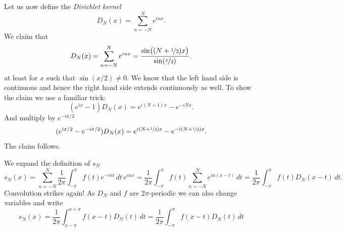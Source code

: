 \documentclass[12pt]{book}
\newcommand{\abs}[1]{\left\lvert {#1} \right\rvert}
\theoremstyle{plain}
\theoremstyle{remark}
\theoremstyle{definition}
\theoremstyle{exercise}
\theoremstyle{example}
\begin{document}
Let us now define the \emph{Dirichlet kernel}
$$
D_N(x) = \sum_{n=-N}^N e^{inx} .
$$
We claim that
$$
D_N(x) =
\sum_{n=-N}^N e^{inx}
=
\frac{\sin\bigl( (N+\nicefrac{1}{2})x \bigr)}{\sin(\nicefrac{x}{2})} .
$$
at least for $x$ such that $\sin(x/2) \not= 0$.  We know that the left hand
side is continuous and hence the right hand side extends continuously as well.
To show the claim
we use a familiar trick:
$$
(e^{ix}-1) D_N(x) = e^{i(N+1)x} - e^{-iNx} .
$$
And multiply by $e^{-ix/2}$
$$
(e^{ix/2}-e^{-ix/2}) D_N(x) = e^{i(N+\nicefrac{1}{2})x} -
e^{-i(N+\nicefrac{1}{2})x} .
$$
The claim follows.

We expand the definition of $s_N$
$$
s_N(x) = 
\sum_{n=-N}^N \frac{1}{2\pi} \int_{-\pi}^\pi f(t) e^{-int} \, dt \, e^{inx}
=
\frac{1}{2\pi} \int_{-\pi}^\pi f(t) \sum_{n=-N}^N e^{in(x-t)} \, dt
=
\frac{1}{2\pi} \int_{-\pi}^\pi f(t) D_N(x-t) \, dt .
$$
Convolution strikes again!
As $D_N$ and $f$ are $2\pi$-periodic we can also change variables and write 
$$
s_N(x) = 
\frac{1}{2\pi} \int_{x-\pi}^{x+\pi} f(x-t) D_N(t) \, dt
=
\frac{1}{2\pi} \int_{-\pi}^\pi f(x-t) D_N(t) \, dt
$$
\end{document}
